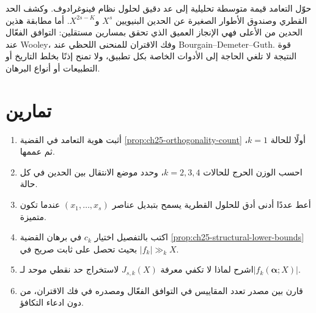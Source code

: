 حوّل التعامد قيمة متوسطة تحليلية إلى عد دقيق لحلول نظام فينوغرادوف. وكشف الحد القطري وصندوق الأطوار الصغيرة عن الحدين البنيويين \(X^s\) و\(X^{2s-K}\). أما مطابقة هذين الحدين من الأعلى فهي الإنجاز العميق الذي تحقق بمسارين مستقلين: التوافق الفعّال عند Wooley، وفك الاقتران للمنحنى اللحظي عند Bourgain--Demeter--Guth. قوة النتيجة لا تلغي الحاجة إلى الأدوات الخاصة بكل تطبيق، ولا تمنح إذنًا بخلط التاريخ أو التطبيعات أو أنواع البرهان.

\section*{تمارين}
\begin{enumerate}
  \item أثبت هوية التعامد في القضية \ref{prop:ch25-orthogonality-count} أولًا للحالة \(k=1\)، ثم عممها.
  \item احسب الوزن الحرج للحالات \(k=2,3,4\)، وحدد موضع الانتقال بين الحدين في كل حالة.
  \item أعط عددًا أدنى أدق للحلول القطرية يسمح بتبديل عناصر \((x_1,\ldots,x_s)\) عندما تكون متميزة.
  \item اكتب بالتفصيل اختيار \(c_k\) في برهان القضية \ref{prop:ch25-structural-lower-bounds} بحيث تحصل على ثابت صريح في \(|f_k|\gg_k X\).
  \item اشرح لماذا لا تكفي معرفة \(J_{s,k}(X)\) لاستخراج حد نقطي موحد لـ\(|f_k(\boldsymbol\alpha;X)|\).
  \item قارن بين مصدر تعدد المقاييس في التوافق الفعّال ومصدره في فك الاقتران، من دون ادعاء التكافؤ.
\end{enumerate}
